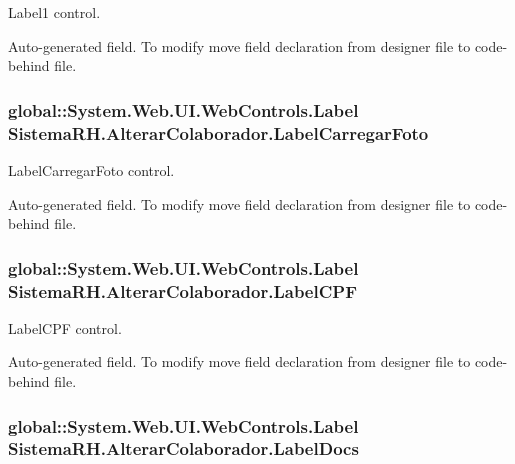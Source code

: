 Label1 control. 

Auto-\/generated field. To modify move field declaration from designer file to code-\/behind file. \hypertarget{class_sistema_r_h_1_1_alterar_colaborador_a1c451f73bd69a8fcdbfd09055fac70c7}{
\subsubsection[{LabelCarregarFoto}]{\setlength{\rightskip}{0pt plus 5cm}global::System.Web.UI.WebControls.Label {\bf SistemaRH.AlterarColaborador.LabelCarregarFoto}}}
\label{class_sistema_r_h_1_1_alterar_colaborador_a1c451f73bd69a8fcdbfd09055fac70c7}


LabelCarregarFoto control. 

Auto-\/generated field. To modify move field declaration from designer file to code-\/behind file. \hypertarget{class_sistema_r_h_1_1_alterar_colaborador_abcbafce8d7c3ee6138fa7a57c63c9008}{
\subsubsection[{LabelCPF}]{\setlength{\rightskip}{0pt plus 5cm}global::System.Web.UI.WebControls.Label {\bf SistemaRH.AlterarColaborador.LabelCPF}}}
\label{class_sistema_r_h_1_1_alterar_colaborador_abcbafce8d7c3ee6138fa7a57c63c9008}


LabelCPF control. 

Auto-\/generated field. To modify move field declaration from designer file to code-\/behind file. \hypertarget{class_sistema_r_h_1_1_alterar_colaborador_a84fc2ee30cec6f8f5d177132ca2b6f15}{
\subsubsection[{LabelDocs}]{\setlength{\rightskip}{0pt plus 5cm}global::System.Web.UI.WebControls.Label {\bf SistemaRH.AlterarColaborador.LabelDocs}}}
\label{class_sistema_r_h_1_1_alterar_colaborador_a84fc2ee30cec6f8f5d177132ca2b6f15}


